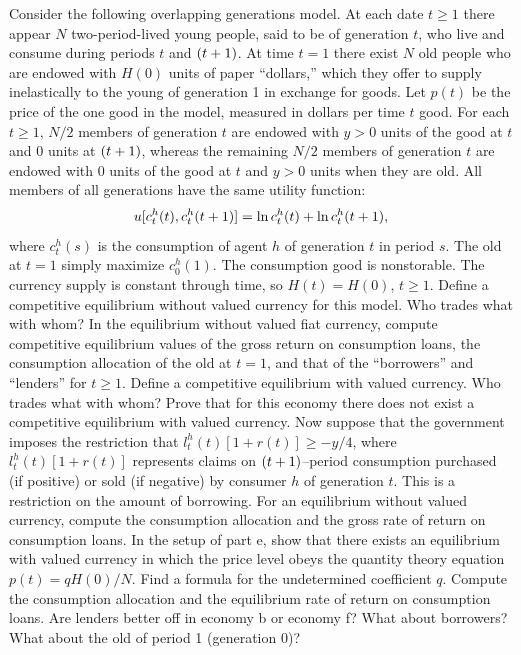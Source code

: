 \medskip
\noindent Consider the following overlapping generations model.  At each date $t\ge 1$
there appear $N$ two-period-lived young people, said to be of generation $t$,
who live and consume during periods $t$ and $({t+1})$.  At time $t=1$ there
exist $N$ old people who are endowed with $H(0)$ units of paper ``dollars,''
which they offer to supply inelastically to the young of generation 1 in
exchange for goods.  Let $p(t)$ be the price of the one good in the model,
measured in dollars per time $t$ good.  For each $t\ge 1$, $N/2$ members of
generation $t$ are endowed with $y>0$ units of the good at $t$ and 0 units at
$({t+1})$, whereas the remaining $N/2$ members of generation $t$ are endowed
with 0 units of the good at $t$ and $y>0$ units when they are old.  All members
of all generations have the same utility function:
$$u[c_t^h(t), c_t^h({t+1})]=\ln c_t^h(t) +\ln c_t^h({t+1}),$$
where $c_t^h(s)$ is the consumption of agent $h$ of generation $t$ in period
$s$.  The old at  $t=1$ simply maximize $c_0^h(1)$.  The consumption good is
nonstorable.  The currency supply is constant through time, so $H(t)=H(0)$,
$t\ge 1$.
\medskip
{} Define a competitive equilibrium without valued currency for this
model.  Who trades what with whom?
\medskip
{} In the equilibrium without valued fiat currency,
 compute   competitive equilibrium values of the
gross return on consumption loans, the consumption allocation of the old at
$t=1$, and that of the ``borrowers'' and ``lenders'' for $t\ge 1$.
\medskip
{} Define a competitive equilibrium with valued currency.  Who trades
what with whom?\medskip
{} Prove that for this economy there does not exist a competitive
equilibrium with valued currency.\medskip
{} Now suppose that the government imposes the restriction that
$l_t^h(t) [1+r(t)]\ge -y/4$, where $l_t^h(t)[1+r(t)]$ represents claims on
$({t+1})$--period consumption purchased (if positive) or sold (if negative) by
consumer $h$ of generation $t$.  This is a restriction on the amount of
borrowing.  For an equilibrium without valued currency, compute the consumption
allocation and the gross rate of return on consumption loans.
\medskip
{} In the setup of part  e,
 show that there exists an equilibrium with
valued currency in which the price level obeys the quantity theory equation
$p(t)=qH(0)/N$.  Find a formula for the undetermined coefficient $q$.  Compute
the consumption allocation and the equilibrium rate of return on consumption
loans.\medskip
{} Are lenders better off in economy b or economy f?  What about
borrowers?  What about the old of period 1 (generation 0)?
\medskip
{}
\medskip

